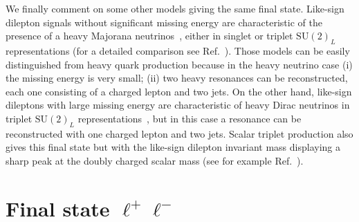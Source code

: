 \documentclass[12pt,a4paper]{article}
\begin{document}
We finally comment on some other models giving the same final state. Like-sign dilepton signals without significant missing energy are characteristic of the presence of a heavy Majorana neutrinos~\cite{Keung:1983uu}, either in singlet or triplet $\text{SU}(2)_L$ representations (for a detailed comparison see Ref.~\cite{AguilarSaavedra:2009ik}). Those models can be easily distinguished from heavy quark production because in the heavy neutrino case (i) the missing energy is very small; (ii) two heavy resonances can be reconstructed, each one consisting of a charged lepton and two jets. On the other hand, like-sign dileptons with large missing energy are characteristic of heavy Dirac neutrinos in triplet $\text{SU}(2)_L$ representations~\cite{AguilarSaavedra:2009ik}, but in this case a resonance can be reconstructed with one charged lepton and two jets. Scalar triplet production also gives this final state but with the like-sign dilepton invariant mass displaying a sharp peak at the doubly charged scalar mass (see for example Ref.~\cite{delAguila:2008cj}).

\section{Final state $\ell^+ \ell^-$}
\label{sec:2opp}
\end{document}
